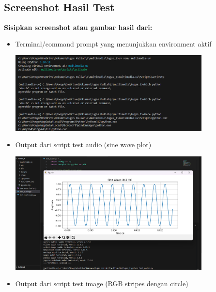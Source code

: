 \documentclass[11pt,a4paper]{article}
\begin{document}
\subsection{Screenshot Hasil Test}
\textbf{Sisipkan screenshot atau gambar hasil dari:}
\begin{itemize}
    \item Terminal/command prompt yang menunjukkan environment aktif
    
    \begin{minipage}{\linewidth}
        \centering
        \includegraphics[width=0.8\textwidth]{Figure/gambar1.png}
        \label{fig:env_active}
    \end{minipage}

    \item Output dari script test audio (sine wave plot)
    
    \begin{minipage}{\linewidth}
        \centering
        \includegraphics[width=0.8\textwidth]{Figure/gambar audio.png}
        \label{fig:sine_wave}
    \end{minipage}

    \item Output dari script test image (RGB stripes dengan circle)
    

\end{itemize}
\end{document}
